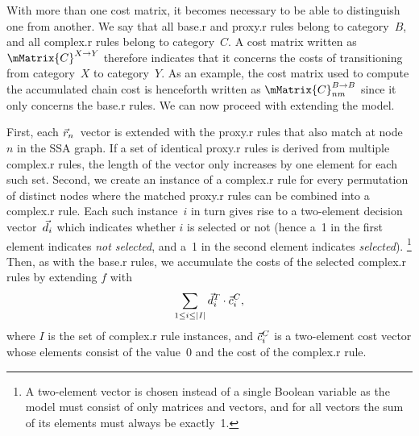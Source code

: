 With more than one cost matrix, it becomes necessary to be able to distinguish
one from another.
%
\newcommand{\mCategory}[1]{#1}
%
We say that all \gls{base.r} and \gls{proxy.r} \glspl{rule} belong to
category~$\mCategory{B}$, and all \gls{complex.r} \glspl{rule} belong to
category~$\mCategory{C}$.
%
A cost matrix written as $\mMatrix{C}^{\mCategory{X} \rightarrow \mCategory{Y}}$
therefore indicates that it concerns the costs of transitioning from
category~$\mCategory{X}$ to category~$\mCategory{Y}$.
%
As an example, the cost matrix used to compute the accumulated chain cost is
henceforth written as $\mMatrix{C}_{nm}^{\mCategory{B} \rightarrow
  \mCategory{B}}$ since it only concerns the \gls{base.r} \glspl{rule}.
%
We can now proceed with extending the  model.

First, each $\vec{r}_n$~vector is extended with the \gls{proxy.r}
\glspl{rule} that also match at \gls{node}~$n$ in the \gls{SSA graph}.
%
If a set of identical \gls{proxy.r} \glspl{rule} is derived from multiple
\gls{complex.r} \glspl{rule}, the length of the vector only increases by one
element for each such set.
%
Second, we create an instance of a \gls{complex.r} \gls{rule} for every
permutation of distinct \glspl{node} where the matched \gls{proxy.r}
\glspl{rule} can be combined into a \gls{complex.r} \gls{rule}.
%
Each such instance~$i$ in turn gives rise to a \mbox{two-element} decision
vector~$\vec{d}_i$ which indicates whether $i$ is selected or not (hence a~1
in the first element indicates \emph{not selected}, and a~1 in the second
element indicates \emph{selected}).\!%
%
\footnote{%
  A \mbox{two-element} vector is chosen instead of a single Boolean variable as
  the  model must consist of only matrices and vectors, and for
  all vectors the sum of its elements must always be exactly~1.%
}
%
Then, as with the \gls{base.r} \glspl{rule}, we accumulate the costs of the
selected \gls{complex.r} \glspl{rule} by extending $f$ with
%
\begin{displaymath}
  \sum_{1 \leq i \leq |I|} \mVector{d}_i^T \cdot
  \mVector{c}_i^{\mCategory{C}},
\end{displaymath}
%
where $I$ is the set of \gls{complex.r} \gls{rule} instances, and
$\mVector{c}_i^{\mCategory{C}}$ is a \mbox{two-element} cost vector whose
elements consist of the value~0 and the cost of the \gls{complex.r} \gls{rule}.

